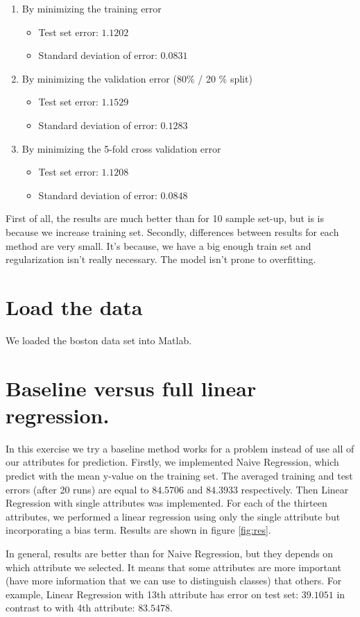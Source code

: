 \documentclass{article} %
\begin{document}
\begin{enumerate}
\item By minimizing the training error
\begin{itemize}
\item Test set error: $1.1202$
\item Standard deviation of error: $0.0831$
\end{itemize}
\item By minimizing the validation error (80\% / 20 \% split)
\begin{itemize}
\item Test set error: $ 1.1529$
\item Standard deviation of error: $ 0.1283$
\end{itemize}
\item By minimizing the 5-fold cross validation error
\begin{itemize}
\item Test set error: $1.1208$
\item Standard deviation of error: $0.0848$
\end{itemize}
\end{enumerate}
First of all, the results are much better than for 10 sample set-up, but is is because we increase training set. Secondly,  differences between results for each method are very small. It's because, we have a big enough train set and regularization isn't really necessary. The model isn't prone to overfitting. 

\section{Load the data}
We loaded the boston data set into Matlab.
\section{Baseline versus full linear regression.}
In this exercise we try a baseline method works for a problem instead of use all of our attributes for prediction. Firstly, we implemented Naive Regression, which predict with the mean y-value on the training set. The averaged training and test errors (after 20 runs) are equal to $ 84.5706$ and $84.3933$ respectively. Then Linear Regression with single attributes was implemented. For each of the thirteen attributes, we performed a linear regression using only the single attribute but incorporating a bias term. Results are shown in figure \ref{fig:res}. 

In general, results are better than for Naive Regression, but they depends on which attribute we selected. It means that some attributes are more important (have more information that we can use to distinguish classes) that others. For example, Linear Regression with 13th attribute has error on test set: $39.1051$ in contrast to with 4th attribute: $83.5478$. 
\end{document}
